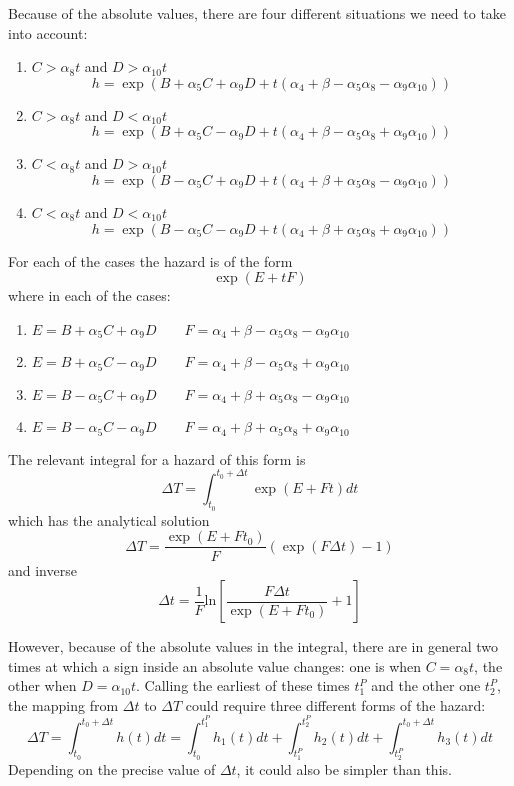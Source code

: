 \documentclass[a4paper,11pt]{article}
\begin{document}
	Because of the absolute values, there are four different situations we need to take into account:
	\begin{enumerate}
		\item $C > \alpha_8 t$ and $D > \alpha_{10} t$ \\
		\[ h = \exp\left(B + \alpha_5 C + \alpha_9 D + t (\alpha_4 + \beta - \alpha_5\alpha_8 - \alpha_9\alpha_{10} ) \right) \]
		\item $C > \alpha_8 t$ and $D < \alpha_{10} t$ \\
		\[ h = \exp\left(B + \alpha_5 C - \alpha_9 D + t (\alpha_4 + \beta - \alpha_5\alpha_8 + \alpha_9\alpha_{10} ) \right) \]
		\item $C < \alpha_8 t$ and $D > \alpha_{10} t$ \\
		\[ h = \exp\left(B - \alpha_5 C + \alpha_9 D + t (\alpha_4 + \beta + \alpha_5\alpha_8 - \alpha_9\alpha_{10} ) \right) \]
		\item $C < \alpha_8 t$ and $D < \alpha_{10} t$ \\
		\[ h = \exp\left(B - \alpha_5 C - \alpha_9 D + t (\alpha_4 + \beta + \alpha_5\alpha_8 + \alpha_9\alpha_{10} ) \right) \]
	\end{enumerate}

	For each of the cases the hazard is of the form
	\[ \exp(E + t F) \]
	where in each of the cases:
	\begin{enumerate}
		\item $E = B + \alpha_5 C + \alpha_9 D \qquad F = \alpha_4 + \beta - \alpha_5\alpha_8 - \alpha_9\alpha_{10} $
		\item $E = B + \alpha_5 C - \alpha_9 D \qquad F = \alpha_4 + \beta - \alpha_5\alpha_8 + \alpha_9\alpha_{10} $
		\item $E = B - \alpha_5 C + \alpha_9 D \qquad F = \alpha_4 + \beta + \alpha_5\alpha_8 - \alpha_9\alpha_{10} $
		\item $E = B - \alpha_5 C - \alpha_9 D \qquad F = \alpha_4 + \beta + \alpha_5\alpha_8 + \alpha_9\alpha_{10} $
	\end{enumerate}

	The relevant integral for a hazard of this form is
	\[ \Delta T = \int_{t_0}^{t_0 + \Delta t} \exp(E + F t) dt \]
	which has the analytical solution
	\[ \Delta T = \frac{\exp(E+F t_0)}{F}\left(\exp(F\Delta t) - 1\right) \]
	and inverse
	\[ \Delta t = \frac{1}{F}\mathrm{ln}\left[ \frac{F\Delta t}{\exp(E + F t_0)} + 1\right] \]

	However, because of the absolute values in the integral, there are in general two times at which a
	sign inside an absolute value changes: one is when $C = \alpha_8 t$, the other when $D = \alpha_{10} t$.
	Calling the earliest of these times $t_1^P$ and the other one $t_2^P$, the mapping from $\Delta t$ to
	$\Delta T$ could require three different forms of the hazard:
	\[ \Delta T = \int_{t_0}^{t_0 + \Delta t} h(t) dt 
	            = \int_{t_0}^{t_1^P} h_1(t) dt
				+ \int_{t_1^P}^{t_2^P} h_2(t) dt
				+ \int_{t_2^P}^{t_0 + \Delta t} h_3(t) dt \]
	Depending on the precise value of $\Delta t$, it could also be simpler than this.
\end{document}
